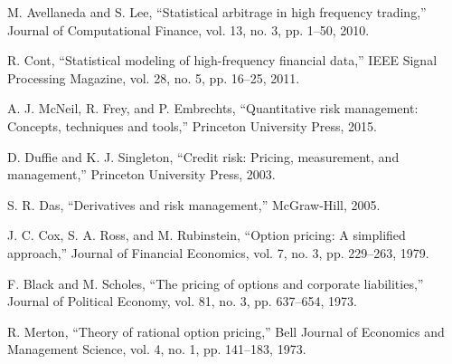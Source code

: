 \documentclass[conference]{IEEEtran}
\begin{document}
\begin{thebibliography}{00}
 M. Avellaneda and S. Lee, ``Statistical arbitrage in high frequency trading,'' Journal of Computational Finance, vol. 13, no. 3, pp. 1--50, 2010.

 R. Cont, ``Statistical modeling of high-frequency financial data,'' IEEE Signal Processing Magazine, vol. 28, no. 5, pp. 16--25, 2011.

 A. J. McNeil, R. Frey, and P. Embrechts, ``Quantitative risk management: Concepts, techniques and tools,'' Princeton University Press, 2015.

 D. Duffie and K. J. Singleton, ``Credit risk: Pricing, measurement, and management,'' Princeton University Press, 2003.

 S. R. Das, ``Derivatives and risk management,'' McGraw-Hill, 2005.

 J. C. Cox, S. A. Ross, and M. Rubinstein, ``Option pricing: A simplified approach,'' Journal of Financial Economics, vol. 7, no. 3, pp. 229--263, 1979.

 F. Black and M. Scholes, ``The pricing of options and corporate liabilities,'' Journal of Political Economy, vol. 81, no. 3, pp. 637--654, 1973.

 R. Merton, ``Theory of rational option pricing,'' Bell Journal of Economics and Management Science, vol. 4, no. 1, pp. 141--183, 1973.

\end{thebibliography}
\end{document}
